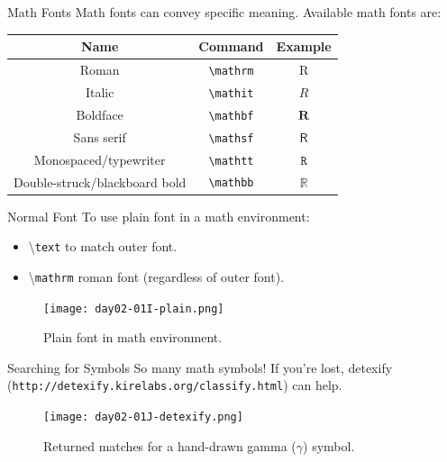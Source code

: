 \documentclass{beamer}
\begin{document}
{  \begin{frame}{Math Fonts}  
    Math fonts can convey specific meaning. Available math fonts are:
    \begin{table}
      \begin{tabular}{c|c|c}
        \textbf{Name} & \textbf{Command} & \textbf{Example} \\ \hline
        Roman & \texttt{\textbackslash mathrm} & $\mathrm{R}$ \\ \hline
        Italic & \texttt{\textbackslash mathit} & $\mathit{R}$ \\ \hline
        Boldface & \texttt{\textbackslash mathbf} & $\mathbf{R}$ \\ \hline
        Sans serif & \texttt{\textbackslash mathsf} & $\mathsf{R}$ \\ \hline
        Monospaced/typewriter & \texttt{\textbackslash mathtt} & $\mathtt{R}$ \\ \hline
        Double-struck/blackboard bold & \texttt{\textbackslash mathbb} & $\mathbb{R}$ 
      \end{tabular}
    \end{table}
  \end{frame}

  \begin{frame}{Normal Font}
    To use plain font in a math environment:
    \begin{itemize} 
      \item \textbackslash\texttt{text} to match outer font.
      \item \textbackslash\texttt{mathrm} roman font (regardless of outer font).
    \end{itemize}
    \begin{figure}
      \texttt{[image: day02-01I-plain.png]}
      \caption{Plain font in math environment.}
      \label{fig:day02-01I}
    \end{figure}
  \end{frame}

  \begin{frame}{Searching for Symbols}
    So many math symbols! If you're lost, detexify (\texttt{http://detexify.kirelabs.org/classify.html}) can help.
    \begin{figure}
      \texttt{[image: day02-01J-detexify.png]}
      \caption{Returned matches for a hand-drawn gamma ($\gamma$) symbol.}
      \label{fig:day02-01J}
    \end{figure}
  \end{frame}

}
\end{document}
